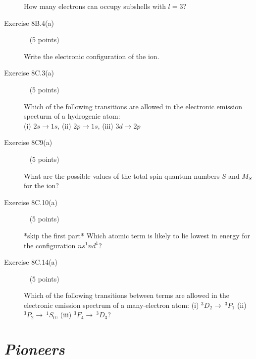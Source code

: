\documentclass[10pt, letterpaper]{memoir}
\begin{document}
\begin{description}
	How many electrons can occupy subshells with $l=3$?
	
	\vspace{8em}
	\item [Exercise 8B.4(a)] ~ (5 points)
	
	Write the electronic configuration of the  ion.
	
	\vspace{8em}
	\item [Exercise 8C.3(a)] ~ (5 points)
	
	Which of the following transitions are allowed in the electronic emission specturm of a hydrogenic atom: \\(i) $2s\rightarrow1s$, (ii) $2p\rightarrow1s$, (iii) $3d\rightarrow2p$
	
	
	\vspace{8em}
	\item [Exercise 8C9(a)] ~ (5 points)
	
	What are the possible values of the total spin quantum numbers $S$ and $M_S$ for the  ion?
	
	\vspace{10em}
	\item [Exercise 8C.10(a)] ~ (5 points)
	
	*skip the first part* Which atomic term is likely to lie lowest in energy for the configuration $ns^1nd^1$?
	
	\vspace{12em}
	\item [Exercise 8C.14(a)] ~ (5 points)
	
	Which of the following transitions between terms are allowed in the electronic emission spectrum of a many-electron atom: (i) $^3D_2\rightarrow~^3P_1$ (ii) $^3P_2\rightarrow~^1S_0$, (iii) $^3F_4\rightarrow~^3D_3$?
\end{description}

\newpage
\pagestyle{empty}
\addtocounter{page}{-1}
\section*{\emph{Pioneers}}
\end{document}
